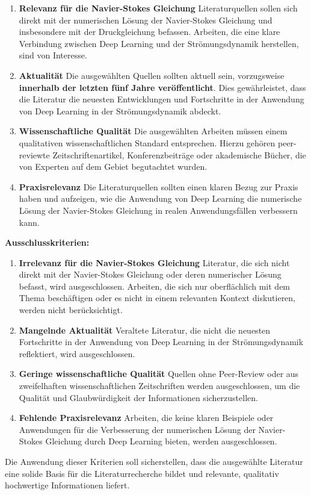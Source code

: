 \begin{enumerate}
  \item \textbf{Relevanz für die Navier-Stokes Gleichung} Literaturquellen sollen sich direkt mit der numerischen Lösung der Navier-Stokes Gleichung und insbesondere mit der Druckgleichung befassen. Arbeiten, die eine klare Verbindung zwischen Deep Learning und der Strömungsdynamik herstellen, sind von Interesse.
  
  \item \textbf{Aktualität} Die ausgewählten Quellen sollten aktuell sein, vorzugsweise \textbf{innerhalb der letzten fünf Jahre veröffentlicht}. Dies gewährleistet, dass die Literatur die neuesten Entwicklungen und Fortschritte in der Anwendung von Deep Learning in der Strömungsdynamik abdeckt.
  
  \item \textbf{Wissenschaftliche Qualität} Die ausgewählten Arbeiten müssen einem qualitativen wissenschaftlichen Standard entsprechen. Hierzu gehören peer-reviewte Zeitschriftenartikel, Konferenzbeiträge oder akademische Bücher, die von Experten auf dem Gebiet begutachtet wurden.
  
  \item \textbf{Praxisrelevanz} Die Literaturquellen sollten einen klaren Bezug zur Praxis haben und aufzeigen, wie die Anwendung von Deep Learning die numerische Lösung der Navier-Stokes Gleichung in realen Anwendungsfällen verbessern kann.
\end{enumerate}

\textbf{Ausschlusskriterien:}

\begin{enumerate}
  \item \textbf{Irrelevanz für die Navier-Stokes Gleichung} Literatur, die sich nicht direkt mit der Navier-Stokes Gleichung oder deren numerischer Lösung befasst, wird ausgeschlossen. Arbeiten, die sich nur oberflächlich mit dem Thema beschäftigen oder es nicht in einem relevanten Kontext diskutieren, werden nicht berücksichtigt.
  
  \item \textbf{Mangelnde Aktualität} Veraltete Literatur, die nicht die neuesten Fortschritte in der Anwendung von Deep Learning in der Strömungsdynamik reflektiert, wird ausgeschlossen.
  
  \item \textbf{Geringe wissenschaftliche Qualität} Quellen ohne Peer-Review oder aus zweifelhaften wissenschaftlichen Zeitschriften werden ausgeschlossen, um die Qualität und Glaubwürdigkeit der Informationen sicherzustellen.
  
  \item \textbf{Fehlende Praxisrelevanz} Arbeiten, die keine klaren Beispiele oder Anwendungen für die Verbesserung der numerischen Lösung der Navier-Stokes Gleichung durch Deep Learning bieten, werden ausgeschlossen.
\end{enumerate}

Die Anwendung dieser Kriterien soll sicherstellen, dass die ausgewählte Literatur eine solide Basis für die Literaturrecherche bildet und relevante, qualitativ hochwertige Informationen liefert.
